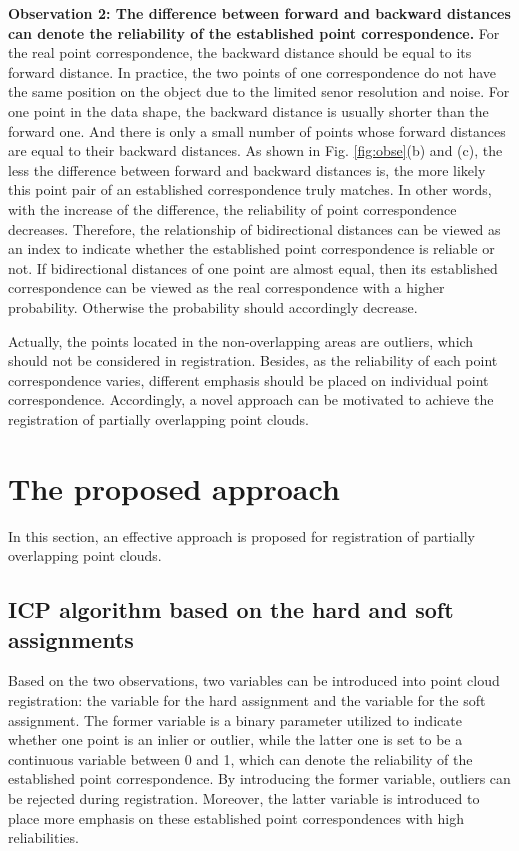 \documentclass[review]{elsarticle}
\begin{document}
{\bfseries Observation 2: The difference between forward and backward distances can denote the reliability of the established point correspondence.}
For the real point correspondence, the backward distance should be equal to its forward distance. In practice, the two points of one correspondence
do not have the same position on the object due to the limited senor resolution and noise. For one point in the data shape, the backward distance is usually shorter than the forward one. And there is only a small number of points whose forward distances are equal to their backward distances. As shown in Fig. \ref{fig:obse}(b) and (c), the less the difference between forward and backward distances is, the more likely this point pair of an established correspondence truly matches. In other words, with the increase of the difference, the reliability of point correspondence decreases. Therefore, the relationship of bidirectional distances can be viewed as an index to indicate whether the established point correspondence is reliable or not. If bidirectional distances of one point are almost equal, then its established correspondence can be viewed as the real correspondence with a higher probability. Otherwise the probability should accordingly decrease.

Actually, the points located in the non-overlapping areas are outliers, which should not be considered in registration. Besides, as the reliability of each point correspondence varies, different emphasis should be placed on individual point correspondence. Accordingly, a novel approach can be motivated to achieve the registration of partially overlapping point clouds.


\section{The proposed approach}
In this section, an effective approach is proposed for registration of partially overlapping point clouds.

\subsection{ICP algorithm based on the hard and soft assignments}

Based on the two observations, two variables can be introduced into point cloud registration: the variable for the hard assignment and the variable for the soft assignment. The former variable is a binary parameter utilized to indicate whether one point is an inlier or outlier, while the latter one is set to be a continuous variable between 0 and 1, which can denote the reliability of the established point correspondence. By introducing the former variable, outliers can be rejected during registration. Moreover, the latter variable is introduced to place more emphasis on these established point correspondences with high reliabilities.
\end{document}
